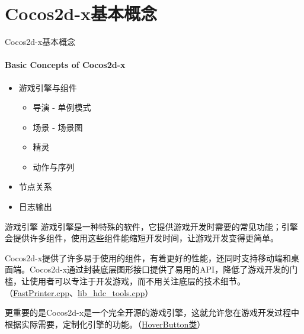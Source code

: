 \documentclass{beamer}
\newcommand{\hrefcol}[2]{\textcolor{cyan}{\href{#1}{#2}}}
\begin{document}

\section{Cocos2d-x基本概念}


\begin{chapter}{}{Cocos2d-x基本概念}
\framesubtitle{Basic Concepts of Cocos2d-x}
\begin{itemize}
\item 游戏引擎与组件
\begin{itemize}
\item 导演 - 单例模式
\item 场景 - 场景图
\item 精灵
\item 动作与序列
\end{itemize}
\item 节点关系
\item 日志输出
\end{itemize}
\end{chapter}


\begin{frame}[fragile]{游戏引擎}
游戏引擎是一种特殊的软件，它提供游戏开发时需要的常见功能；引擎会提供许多组件，使用这些组件能缩短开发时间，让游戏开发变得更简单。

\vspace{1em}

Cocos2d-x提供了许多易于使用的组件，有着更好的性能，还同时支持移动端和桌面端。Cocos2d-x通过封装底层图形接口提供了易用的API，降低了游戏开发的门槛，让使用者可以专注于开发游戏，而不用关注底层的技术细节。（\hrefcol{https://github.com/MinmusLin/Advanced_Language_Programming_and_OOP_Course_Projects/blob/main/common/FastPrinter.cpp}{FastPrinter.cpp}、\hrefcol{https://github.com/MinmusLin/Advanced_Language_Programming_and_OOP_Course_Projects/blob/main/common/lib_hdc_tools.cpp}{lib\_hdc\_tools.cpp}）

\vspace{1em}

更重要的是Cocos2d-x是一个完全开源的游戏引擎，这就允许您在游戏开发过程中根据实际需要，定制化引擎的功能。（\hrefcol{https://github.com/MinmusLin/Teamfight_Tactics/blob/main/Classes/Button}{HoverButton类}）
\end{frame}

\end{document}
